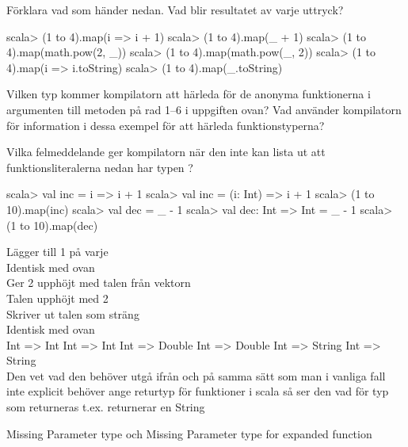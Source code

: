 \Subtask Förklara vad som händer nedan. Vad blir resultatet av varje uttryck?

\begin{REPL}
scala> (1 to 4).map(i => i + 1)
scala> (1 to 4).map(_ + 1)
scala> (1 to 4).map(math.pow(2, _))
scala> (1 to 4).map(math.pow(_, 2))
scala> (1 to 4).map(i => i.toString)
scala> (1 to 4).map(_.toString)
\end{REPL}

\Subtask Vilken typ kommer kompilatorn att härleda för de anonyma funktionerna i argumenten till metoden  på rad 1--6 i uppgiften ovan? Vad använder kompilatorn för information i dessa exempel för att härleda funktionstyperna?

\Subtask Vilka felmeddelande ger kompilatorn när den inte kan lista ut att funktionsliteralerna nedan har typen ?

\begin{REPL}
scala> val inc = i => i + 1
scala> val inc = (i: Int) => i + 1
scala> (1 to 10).map(inc)
scala> val dec = _ - 1
scala> val dec: Int => Int = _ - 1
scala> (1 to 10).map(dec)
\end{REPL}



\SOLUTION


\TaskSolved \what


\SubtaskSolved
{} Lägger till 1 på varje\\
 Identisk med ovan\\
 Ger 2 upphöjt med talen från vektorn\\
 Talen upphöjt med 2\\
 Skriver ut talen som sträng\\
 Identisk med ovan\\

\SubtaskSolved
Int => Int
Int => Int
Int => Double
Int => Double
Int => String
Int => String \\
Den vet vad den behöver utgå ifrån och på samma sätt som man i vanliga fall inte explicit behöver ange returtyp för funktioner i scala så ser den vad för typ som returneras t.ex.  returnerar en String

\SubtaskSolved
Missing Parameter type och Missing Parameter type for expanded function



\QUESTEND




